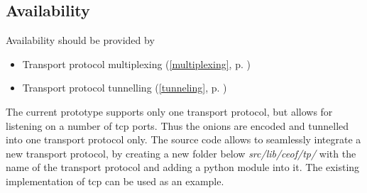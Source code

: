 \subsection{Availability}
Availability should be provided by
\begin{itemize}
\item Transport protocol multiplexing (\ref{multiplexing}, p. \pageref{multiplexing})
\item Transport protocol tunnelling (\ref{tunneling}, p. \pageref{tunneling})
\end{itemize}
The current prototype supports only one transport protocol, but allows for listening on
a number of tcp ports. Thus the onions are encoded and tunnelled into
one transport protocol only. The source code allows to seamlessly integrate a new
transport protocol, by creating a new folder below
\textit{src/lib/ceof/tp/} with the name of the transport protocol and adding
a python module into it. The existing implementation of tcp can be used
as an example.
